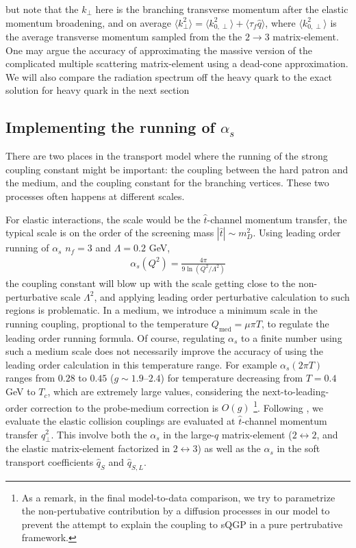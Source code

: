 but note that the $k_\perp$ here is the branching transverse momentum after the elastic momentum broadening, and on average $\langle k_\perp^2 \rangle = \langle k_{0,\perp}^2 \rangle + \langle\tau_f\hat{q}\rangle$, where $\langle k_{0,\perp}^2 \rangle$ is the average transverse momentum sampled from the the $2\rightarrow 3$ matrix-element.
One may argue the accuracy of approximating the massive version of the complicated multiple scattering matrix-element using a dead-cone approximation.
We will also compare the radiation spectrum off the heavy quark to the exact solution for heavy quark in the next section

\subsection{Implementing the running of $\alpha_s$}
There are two places in the transport model where the running of the strong coupling constant might be important:
the coupling between the hard patron and the medium, and the coupling constant for the branching vertices.
These two processes often happens at different scales.

For elastic interactions, the scale would be the $\hat{t}$-channel momentum transfer, the typical scale is on the order of the screening mass $|\hat{t}| \sim m_D^2$.  
Using leading order running of $\alpha_s$ $n_f = 3$ and $\Lambda = 0.2$ GeV, 
\begin{eqnarray}
\alpha_s(Q^2) = \frac{4\pi}{9\ln\left(Q^2/\Lambda^2\right)}
\end{eqnarray}
the coupling constant will blow up with the scale getting close to the non-perturbative scale $\Lambda^2$, and applying leading order perturbative calculation to such regions is problematic. 
In a medium, we introduce a minimum scale in the running coupling, proptional to the temperature $Q_{\textrm{med}} = \mu \pi T$, to regulate the leading order running formula.
Of course, regulating $\alpha_s$ to a finite number using such a medium scale does not necessarily improve the accuracy of using the leading order  calculation in this temperature range. 
For example $\alpha_s(2\pi T)$ ranges from $0.28$ to $0.45$ ($g \sim 1.9$--$2.4$) for temperature decreasing from $T=0.4$ GeV to $T_c$, which are extremely large values, considering the next-to-leading-order correction to the probe-medium correction is $O(g)$  
\footnote{As a remark, in the final model-to-data comparison, we try to parametrize the non-pertubative contribution by a diffusion processes in our model to prevent the attempt to explain the coupling to sQGP in a pure pertrubative framework.}.
Following \cite{Arnold:2008zu}, we evaluate the elastic collision couplings are evaluated at $\hat{t}$-channel momentum transfer $q_\perp^2$.
This involve both the $\alpha_s$ in the large-$q$ matrix-element ($2\leftrightarrow 2$, and the elastic matrix-element factorized in $2\leftrightarrow 3$) as well as the $\alpha_s$ in the soft transport coefficients $\hat{q}_S$ and $\hat{q}_{S, L}$.

